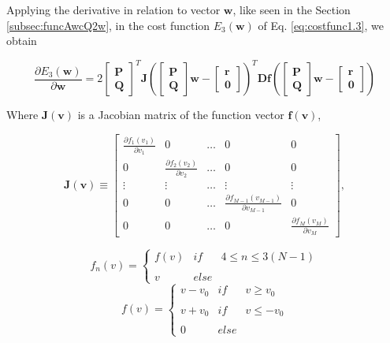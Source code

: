 Applying the derivative in relation to vector $\mathbf{w}$, 
like seen in the Section \ref{subsec:funcAwcQ2w},
in the cost function $E_{3}(\mathbf{w})$ of Eq. \ref{eq:costfunc1.3}, 
we obtain

\begin{equation}\label{eq:DE1.3}
\frac{\partial E_{3}(\mathbf{w})}{\partial \mathbf{w}}
=
2
\begin{bmatrix}
\mathbf{P}\\
\mathbf{Q}
\end{bmatrix}^{T}
\mathbf{J}
\left(
\begin{bmatrix}
\mathbf{P}\\
\mathbf{Q}
\end{bmatrix}
\mathbf{w}
-
\begin{bmatrix}
\mathbf{r}\\
\mathbf{0}
\end{bmatrix}
\right)^{T}
\mathbf{D}
\mathbf{f}
\left(
\begin{bmatrix}
\mathbf{P}\\
\mathbf{Q}
\end{bmatrix}
\mathbf{w}
-
\begin{bmatrix}
\mathbf{r}\\
\mathbf{0}
\end{bmatrix}
\right)
\end{equation}

Where $\mathbf{J}(\mathbf{v})$ is a Jacobian matrix of the function vector $\mathbf{f}(\mathbf{v})$,

\begin{equation}
\mathbf{J}(\mathbf{v})
\equiv
\begin{bmatrix}
\frac{\partial f_{1}(v_{1})}{\partial v_{1}} & 0  & \dots & 0      & 0\\
0  & \frac{\partial f_{2}(v_{2})}{\partial v_{2}} & \dots & 0      & 0\\
\vdots                  & \vdots                  & \dots & \vdots & \vdots\\
0                       & 0                       & \dots & \frac{\partial f_{M-1}(v_{M-1})}{\partial v_{M-1}} & 0\\
0                       & 0                       & \dots & 0      & \frac{\partial f_{M}(v_{M})}{\partial v_{M}}
\end{bmatrix},
\end{equation}


\begin{equation}
f_{n}(v)=
\left\{
\begin{matrix}
f(v) & if &  4 \leq n \leq 3(N-1) \\
& &\\
v & else &
\end{matrix}
\right.
\end{equation}
\begin{equation}
f(v)=
\left\{
\begin{matrix}
v-v_0 & if &  v \geq  v_0 \\
& &\\
v+v_0 & if &  v \leq -v_0 \\
& &\\
0 & else & 
\end{matrix}
\right.
\end{equation}

